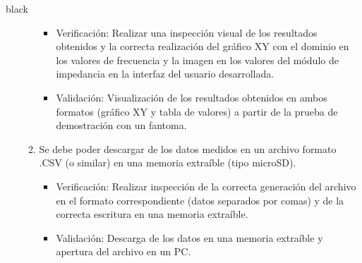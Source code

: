 \documentclass[11pt]{charter}
\begin{document}
\begin{consigna}{black}
\begin{enumerate}
\begin{enumerate}
\begin{itemize}
		\item Verificación: Realizar una inspección visual de los resultados obtenidos y la correcta realización del gráfico XY con el dominio en los valores de frecuencia y la imagen en los valores del módulo de impedancia en la interfaz del usuario desarrollada.
		\item Validación: Visualización de los resultados obtenidos en ambos formatos (gráfico XY y tabla de valores) a partir de la prueba de demostración con un fantoma.\\
\end{itemize}	
	\item Se debe poder descargar de los datos medidos en un archivo formato .CSV (o similar) en una memoria extraíble (tipo microSD).
	\begin{itemize}
		\item Verificación: Realizar inspección de la correcta generación del archivo en el formato correspondiente (datos separados por comas) y de la correcta escritura en una memoria extraíble.
		\item Validación: Descarga de los datos en una memoria extraíble y apertura del archivo en un PC.\\
	\end{itemize}
\end{enumerate}


\end{enumerate}
\end{consigna}
\end{document}
